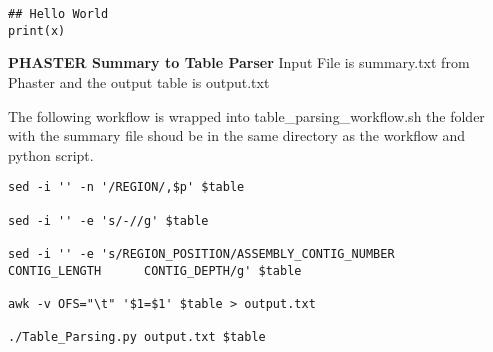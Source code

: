 \documentclass[idxtotoc,hyperref,openany,oneside]{labbook} %
\begin{document}
\begin{lstlisting}
## Hello World 
print(x)
\end{lstlisting} 



\textbf{PHASTER Summary to Table Parser}
Input File is summary.txt from Phaster and the output table is output.txt

The following workflow is wrapped into table\_parsing\_workflow.sh the folder with the summary file shoud be in the same directory as the workflow and python script.

\begin{verbatim}
sed -i '' -n '/REGION/,$p' $table

sed -i '' -e 's/-//g' $table

sed -i '' -e 's/REGION_POSITION/ASSEMBLY_CONTIG_NUMBER
CONTIG_LENGTH      CONTIG_DEPTH/g' $table

awk -v OFS="\t" '$1=$1' $table > output.txt

./Table_Parsing.py output.txt $table
\end{verbatim} 
\end{document}
